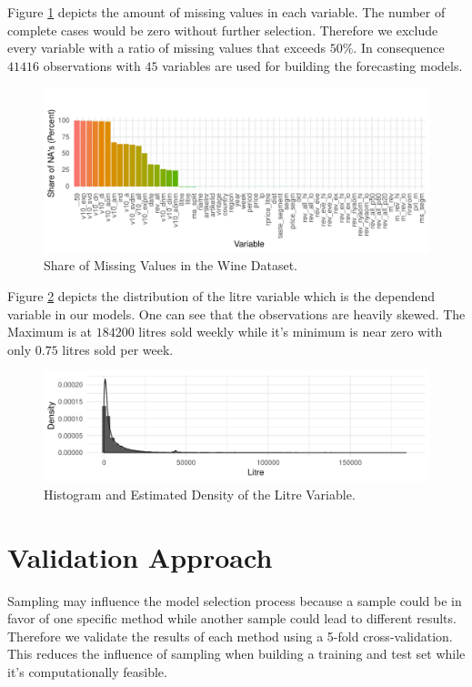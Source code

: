 \documentclass[11pt,]{article}
\begin{document}
Figure \ref{fig:NAs} depicts the amount of missing values in each
variable. The number of complete cases would be zero without further
selection. Therefore we exclude every variable with a ratio of missing
values that exceeds \(50\%\). In consequence \(41416\) observations with
\(45\) variables are used for building the forecasting models.

\begin{figure}
\centering
\includegraphics{../00_data/output_paper/02_missings_alt.pdf}
\caption{\label{fig:NAs}Share of Missing Values in the Wine Dataset.}
\end{figure}

Figure \ref{fig:HistLitre} depicts the distribution of the litre
variable which is the dependend variable in our models. One can see that
the observations are heavily skewed. The Maximum is at \(184200\) litres
sold weekly while it's minimum is near zero with only \(0.75\) litres
sold per week.

\begin{figure}
\centering
\includegraphics{../00_data/output_paper/04_hist_litre.pdf}
\caption{\label{fig:HistLitre}Histogram and Estimated Density of the
Litre Variable.}
\end{figure}

\hypertarget{validation-approach}{%
\section{Validation Approach}\label{validation-approach}}

Sampling may influence the model selection process because a sample
could be in favor of one specific method while another sample could lead
to different results. Therefore we validate the results of each method
using a 5-fold cross-validation. This reduces the influence of sampling
when building a training and test set while it's computationally
feasible.
\end{document}
